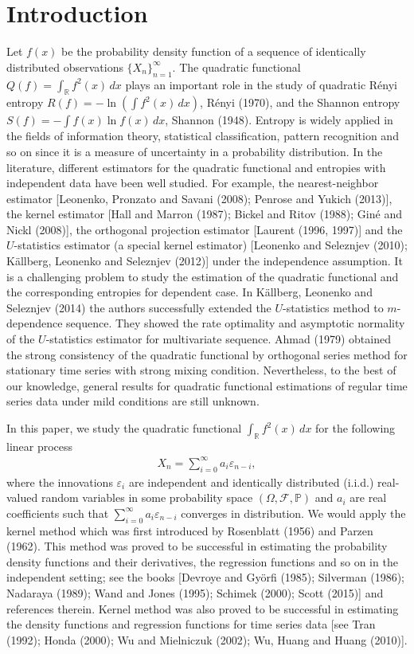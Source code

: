 \documentclass[11pt]{article}
\def\R{{\mathbb R}}
\def\P{{\mathbb P}}
\begin{document}
\section{Introduction}
Let $f(x)$ be the probability density function of a sequence of identically distributed observations $\{X_n\}_{n=1}^{\infty}$. The quadratic functional $Q(f)=\int_{\R} f^2(x)\,dx$ plays an important role in the study of quadratic R\'{e}nyi entropy  $R(f)=-\ln (\int f^2(x)\,dx)$,  R\'{e}nyi (1970),   and the Shannon entropy  $S(f)=-\int f(x)\ln f(x)\,dx$,  Shannon (1948). Entropy is widely applied in the fields of information theory, statistical classification, pattern recognition and so on since it is a measure of uncertainty in a probability distribution. In the literature, different estimators for the quadratic functional and entropies with independent data  have been well studied. For example, the nearest-neighbor estimator [Leonenko, Pronzato and Savani (2008);  Penrose and Yukich (2013)],   the kernel estimator [Hall and Marron (1987); Bickel and Ritov (1988); Gin\'{e} and Nickl (2008)],  the orthogonal projection estimator [Laurent (1996, 1997)] and the $U$-statistics estimator  (a special kernel estimator) [Leonenko and Seleznjev (2010);  K\"{a}llberg,  Leonenko and Seleznjev (2012)] under the independence
assumption. It is a challenging problem to study the estimation of the quadratic functional and the corresponding entropies for dependent case.  In  K\"{a}llberg,  Leonenko and Seleznjev (2014)  the authors successfully extended the $U$-statistics method to $m$-dependence sequence. They showed the rate optimality and asymptotic normality of the $U$-statistics estimator for multivariate sequence.  Ahmad (1979) obtained the strong consistency of the quadratic functional by orthogonal series method for stationary time series with strong mixing condition. Nevertheless, to the best of our knowledge, general results for quadratic functional estimations of regular time series data under mild conditions are still unknown.  

In this paper, we study the quadratic functional $\int_{\R} f^2(x)\, dx$ for the following linear process
\begin{align}\label{lp}
X_n=\sum\limits_{i=0}^\infty a_i \varepsilon_{n-i},
\end{align}
 where the innovations $\varepsilon_i$ are independent and identically distributed
(i.i.d.)  real-valued random variables in some probability space $(\Omega, \mathcal{F}, \P)$ and $a_i$ are real coefficients such that $\sum\limits_{i=0}^\infty a_i \varepsilon_{n-i}$ converges in distribution. We would apply the kernel method which was first introduced by Rosenblatt (1956) and Parzen (1962). This method was proved to be successful in estimating the probability density functions and their derivatives, the regression functions and so on in the independent setting; see the books [Devroye and Gy\"{o}rfi (1985); Silverman (1986); Nadaraya (1989); Wand and Jones (1995);  Schimek (2000); Scott (2015)] and references therein. Kernel method was also proved to be successful in estimating the density functions and regression functions for time series data [see Tran (1992); Honda (2000); Wu and Mielniczuk (2002); Wu, Huang and Huang (2010)]. 
\end{document}
